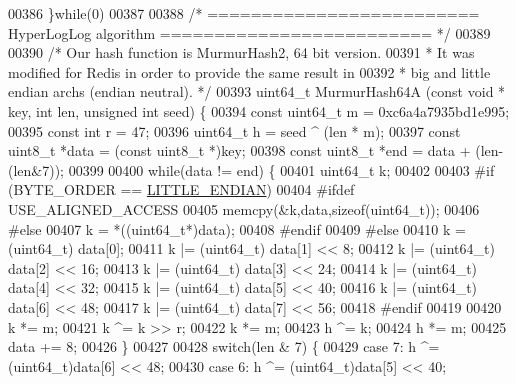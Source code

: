 \begin{DoxyCode}
{{00386 \textcolor{preprocessor}{\}}\textcolor{keywordflow}{while}\textcolor{preprocessor}{(}0\textcolor{preprocessor}{)}
00387 
00388 \textcolor{comment}{/* ========================= HyperLogLog algorithm  ========================= */}
00389 
00390 \textcolor{comment}{/* Our hash function is MurmurHash2, 64 bit version.}
00391 \textcolor{comment}{ * It was modified for Redis in order to provide the same result in}
00392 \textcolor{comment}{ * big and little endian archs (endian neutral). */}
00393 uint64\_t MurmurHash64A (\textcolor{keyword}{const} \textcolor{keywordtype}{void} * key, \textcolor{keywordtype}{int} len, \textcolor{keywordtype}{unsigned} \textcolor{keywordtype}{int} seed) \{
00394     \textcolor{keyword}{const} uint64\_t m = 0xc6a4a7935bd1e995;
00395     \textcolor{keyword}{const} \textcolor{keywordtype}{int} r = 47;
00396     uint64\_t h = seed ^ (len * m);
00397     \textcolor{keyword}{const} uint8\_t *data = (\textcolor{keyword}{const} uint8\_t *)key;
00398     \textcolor{keyword}{const} uint8\_t *end = data + (len-(len&7));
00399 
00400     \textcolor{keywordflow}{while}(data != end) \{
00401         uint64\_t k;
00402 
00403 \textcolor{preprocessor}{#}\textcolor{preprocessor}{if} \textcolor{preprocessor}{(}BYTE\_ORDER \textcolor{preprocessor}{==} \hyperlink{config_8h_a8782a401fbf55261460863fc2f8df1ce}{LITTLE\_ENDIAN}\textcolor{preprocessor}{)}
00404     \textcolor{preprocessor}{#}\textcolor{preprocessor}{ifdef} \textcolor{preprocessor}{USE\_ALIGNED\_ACCESS}
00405     memcpy(&k,data,\textcolor{keyword}{sizeof}(uint64\_t));
00406     \textcolor{preprocessor}{#}\textcolor{preprocessor}{else}
00407         k = *((uint64\_t*)data);
00408     \textcolor{preprocessor}{#}\textcolor{preprocessor}{endif}
00409 \textcolor{preprocessor}{#}\textcolor{preprocessor}{else}
00410         k = (uint64\_t) data[0];
00411         k |= (uint64\_t) data[1] << 8;
00412         k |= (uint64\_t) data[2] << 16;
00413         k |= (uint64\_t) data[3] << 24;
00414         k |= (uint64\_t) data[4] << 32;
00415         k |= (uint64\_t) data[5] << 40;
00416         k |= (uint64\_t) data[6] << 48;
00417         k |= (uint64\_t) data[7] << 56;
00418 \textcolor{preprocessor}{#}\textcolor{preprocessor}{endif}
00419 
00420         k *= m;
00421         k ^= k >> r;
00422         k *= m;
00423         h ^= k;
00424         h *= m;
00425         data += 8;
00426     \}
00427 
00428     \textcolor{keywordflow}{switch}(len & 7) \{
00429     \textcolor{keywordflow}{case} 7: h ^= (uint64\_t)data[6] << 48;
00430     \textcolor{keywordflow}{case} 6: h ^= (uint64\_t)data[5] << 40;
}}
\end{DoxyCode}
